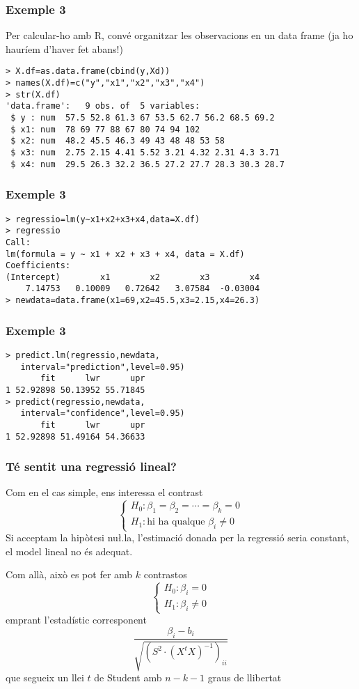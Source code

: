 \documentclass[12pt,t]{beamer}
\theoremstyle{plain}
\theoremstyle{definition}
\begin{document}
\begin{frame}[fragile]
\frametitle{Exemple 3}

Per calcular-ho amb R, convé organitzar les observacions en un data frame (ja ho hauríem d'haver fet abans!)
{\footnotesize \begin{verbatim}
> X.df=as.data.frame(cbind(y,Xd))
> names(X.df)=c("y","x1","x2","x3","x4")
> str(X.df)
'data.frame':	9 obs. of  5 variables:
 $ y : num  57.5 52.8 61.3 67 53.5 62.7 56.2 68.5 69.2
 $ x1: num  78 69 77 88 67 80 74 94 102
 $ x2: num  48.2 45.5 46.3 49 43 48 48 53 58
 $ x3: num  2.75 2.15 4.41 5.52 3.21 4.32 2.31 4.3 3.71
 $ x4: num  29.5 26.3 32.2 36.5 27.2 27.7 28.3 30.3 28.7
\end{verbatim}
}
\end{frame}

\begin{frame}[fragile]
\frametitle{Exemple 3}
\vspace*{-2ex}
\small

\begin{verbatim}
> regressio=lm(y~x1+x2+x3+x4,data=X.df)
> regressio
Call:
lm(formula = y ~ x1 + x2 + x3 + x4, data = X.df)
Coefficients:
(Intercept)        x1        x2        x3        x4  
    7.14753   0.10009   0.72642   3.07584  -0.03004  
> newdata=data.frame(x1=69,x2=45.5,x3=2.15,x4=26.3)
\end{verbatim}

\end{frame}

\begin{frame}[fragile]
\frametitle{Exemple 3}
\vspace*{-2ex}

\begin{verbatim}
> predict.lm(regressio,newdata,
   interval="prediction",level=0.95)
       fit      lwr      upr
1 52.92898 50.13952 55.71845
> predict(regressio,newdata,
   interval="confidence",level=0.95)
       fit      lwr      upr
1 52.92898 51.49164 54.36633
\end{verbatim}

\end{frame}

\begin{frame}
\frametitle{Té sentit una regressió lineal?}
Com en el cas simple, ens interessa el contrast
$$
\left\{\begin{array}{l} H_0: \beta_1=\beta_2=\cdots=\beta_k=0 \\
H_1: \mbox{hi ha qualque }\beta_i\not= 0 \end{array}
\right.
$$
Si acceptam la hipòtesi nu\l.la, l'estimació donada per la regressió seria constant, el model lineal no és adequat.
\medskip

Com allà, això es pot fer amb $k$ contrastos
$$
\left\{\begin{array}{l} H_0: \beta_i=0 \\
H_1: \beta_i\neq 0 \end{array}
\right.
$$
emprant l'estadístic corresponent
$$
\frac{\beta_i-b_i}{\sqrt{(S^2\cdot (X^t X)^{-1})_{ii}}}
$$
que segueix un llei $t$ de Student amb $n-k-1$ graus de
llibertat
\end{frame}
\end{document}
